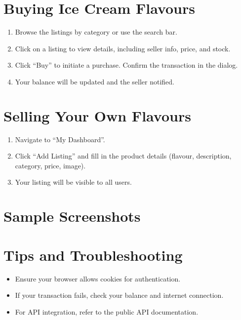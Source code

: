 \documentclass[12pt,a4paper]{report}
\begin{document}
\section{Buying Ice Cream Flavours}
\begin{enumerate}
    \item Browse the listings by category or use the search bar.
    \item Click on a listing to view details, including seller info, price, and stock.
    \item Click “Buy” to initiate a purchase. Confirm the transaction in the dialog.
    \item Your balance will be updated and the seller notified.
\end{enumerate}

\section{Selling Your Own Flavours}
\begin{enumerate}
    \item Navigate to “My Dashboard”.
    \item Click “Add Listing” and fill in the product details (flavour, description, category, price, image).
    \item Your listing will be visible to all users.
\end{enumerate}

\section{Sample Screenshots}
\begin{center}
\end{center}

\section{Tips and Troubleshooting}
\begin{itemize}
    \item Ensure your browser allows cookies for authentication.
    \item If your transaction fails, check your balance and internet connection.
    \item For API integration, refer to the public API documentation.
\end{itemize}
\end{document}
